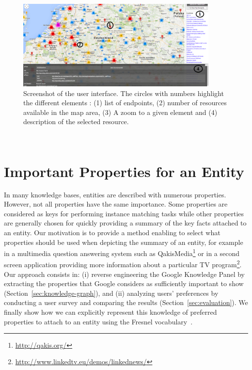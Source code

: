 \begin{figure}[!htbp]
\begin{center}
\includegraphics[width=0.9\textwidth]{img/geoRDFvizpic_1200x.png}
\caption{Screenshot of the user interface. The circles with numbers highlight the different elements : (1) list of endpoints, (2) number of resources available in the map area, (3) A zoom to a given element and (4) description of the selected resource.}
\label{fig:geoviz-ui}
\end{center}
\end{figure}

\



\section{Important Properties for an Entity}
\label{sec:propEntities}
In many knowledge bases, entities are described with numerous properties. However, not all properties have the same importance. Some properties are considered as keys for performing instance matching tasks while other properties are generally chosen for quickly providing a summary of the key facts attached to an entity. Our motivation is to provide a method enabling to select what properties should be used when depicting the summary of an entity, for example in a multimedia question answering system such as QakisMedia\footnote{\url{http://qakis.org/}} or in a second screen application providing more information about a particular TV program\footnote{\url{http://www.linkedtv.eu/demos/linkednews/}}. Our approach consists in: (i) reverse engineering the Google Knowledge Panel by extracting the properties that Google considers as sufficiently important to show (Section~\ref{sec:knowledge-graph}), and (ii) analyzing users' preferences by conducting a user survey and comparing the results (Section~\ref{sec:evaluation}). We finally show how we can explicitly represent this knowledge of preferred properties to attach to an entity using the Fresnel vocabulary~\cite{pietriga2006}. \\

